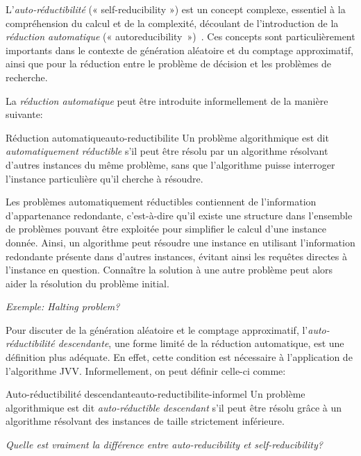 L'\textit{auto-réductibilité} (« self-reducibility ») est un concept complexe, essentiel à la compréhension du calcul et de la complexité, découlant de l'introduction de la \textit{réduction automatique} (« autoreducibility »)~\cite{trakhtenbrotAutoreducibility1970}. Ces concepts sont particulièrement importants dans le contexte de génération aléatoire et du comptage approximatif, ainsi que pour la réduction entre le problème de décision et les problèmes de recherche.

La \textit{réduction automatique} peut être introduite informellement de la manière suivante:

\begin{subdefinition}{Réduction automatique}{auto-reductibilite}
    Un problème algorithmique est dit \textit{automatiquement réductible} s'il peut être résolu par un algorithme résolvant d'autres instances du même problème, sans que l'algorithme puisse interroger l'instance particulière qu'il cherche à résoudre.
\end{subdefinition}

Les problèmes automatiquement réductibles contiennent de l'information d'appartenance redondante, c'est-à-dire qu'il existe une structure dans l'ensemble de problèmes pouvant être exploitée pour simplifier le calcul d'une instance donnée. Ainsi, un algorithme peut résoudre une instance en utilisant l'information redondante présente dans d'autres instances, évitant ainsi les requêtes directes à l'instance en question. Connaître la solution à une autre problème peut alors aider la résolution du problème initial. 

\textcolor{mydarkred}{\textit{Exemple: Halting problem?}}

Pour discuter de la génération aléatoire et le comptage approximatif, l'\textit{auto-réductibilité descendante}, une forme limité de la réduction automatique, est une définition plus adéquate. En effet, cette condition est nécessaire à l'application de l'algorithme JVV. Informellement, on peut définir celle-ci comme:

\begin{maindefinition}{Auto-réductibilité descendante}{auto-reductibilite-informel}
    Un problème algorithmique est dit \textit{auto-réductible descendant} s'il peut être résolu grâce à un algorithme résolvant des instances de taille strictement inférieure.
\end{maindefinition}

\textcolor{mydarkred}{\textit{Quelle est vraiment la différence entre auto-reducibility et self-reducibility?}}

